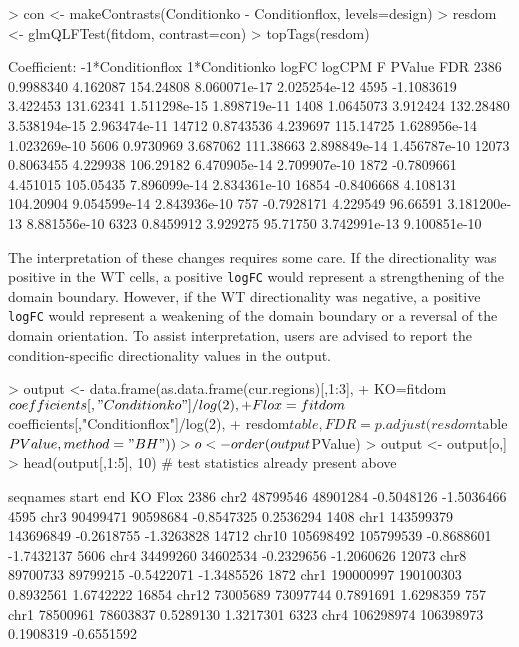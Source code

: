 \documentclass[12pt]{report}
\renewenvironment{Schunk}{\vspace{0pt}}{\vspace{0pt}}
\newcommand{\code}[1]{{\small\texttt{#1}}}
\begin{document}
\begin{Schunk}
\begin{Sinput}
> con <- makeContrasts(Conditionko - Conditionflox, levels=design)
> resdom <- glmQLFTest(fitdom, contrast=con)
> topTags(resdom)
\end{Sinput}
\begin{Soutput}
Coefficient:  -1*Conditionflox 1*Conditionko 
           logFC   logCPM         F       PValue          FDR
2386   0.9988340 4.162087 154.24808 8.060071e-17 2.025254e-12
4595  -1.1083619 3.422453 131.62341 1.511298e-15 1.898719e-11
1408   1.0645073 3.912424 132.28480 3.538194e-15 2.963474e-11
14712  0.8743536 4.239697 115.14725 1.628956e-14 1.023269e-10
5606   0.9730969 3.687062 111.38663 2.898849e-14 1.456787e-10
12073  0.8063455 4.229938 106.29182 6.470905e-14 2.709907e-10
1872  -0.7809661 4.451015 105.05435 7.896099e-14 2.834361e-10
16854 -0.8406668 4.108131 104.20904 9.054599e-14 2.843936e-10
757   -0.7928171 4.229549  96.66591 3.181200e-13 8.881556e-10
6323   0.8459912 3.929275  95.71750 3.742991e-13 9.100851e-10
\end{Soutput}
\end{Schunk}

The interpretation of these changes requires some care.
If the directionality was positive in the WT cells, a positive \code{logFC} would represent a strengthening of the domain boundary.
However, if the WT directionality was negative, a positive \code{logFC} would represent a weakening of the domain boundary or a reversal of the domain orientation.
To assist interpretation, users are advised to report the condition-specific directionality values in the output.

\begin{Schunk}
\begin{Sinput}
> output <- data.frame(as.data.frame(cur.regions)[,1:3],
+     KO=fitdom$coefficients[,"Conditionko"]/log(2),
+     Flox=fitdom$coefficients[,"Conditionflox"]/log(2),
+     resdom$table, FDR=p.adjust(resdom$table$PValue, method="BH"))
> o <- order(output$PValue)
> output <- output[o,]
> head(output[,1:5], 10) # test statistics already present above
\end{Sinput}
\begin{Soutput}
      seqnames     start       end         KO       Flox
2386      chr2  48799546  48901284 -0.5048126 -1.5036466
4595      chr3  90499471  90598684 -0.8547325  0.2536294
1408      chr1 143599379 143696849 -0.2618755 -1.3263828
14712    chr10 105698492 105799539 -0.8688601 -1.7432137
5606      chr4  34499260  34602534 -0.2329656 -1.2060626
12073     chr8  89700733  89799215 -0.5422071 -1.3485526
1872      chr1 190000997 190100303  0.8932561  1.6742222
16854    chr12  73005689  73097744  0.7891691  1.6298359
757       chr1  78500961  78603837  0.5289130  1.3217301
6323      chr4 106298974 106398973  0.1908319 -0.6551592
\end{Soutput}
\end{Schunk}
\end{document}
